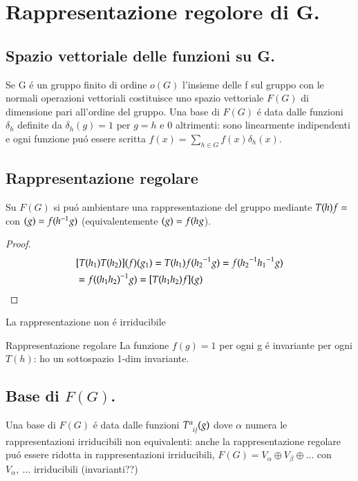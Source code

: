 \documentclass[oneside,12pt]{memoir}
\begin{document}
\section{Rappresentazione regolore di G.}

\subsection{Spazio vettoriale delle funzioni su G.}

Se G \'e un gruppo finito di ordine $o(G)$ l'insieme delle f sul gruppo con le normali operazioni vettoriali costituisce uno spazio vettoriale $F(G)$ di dimensione pari all'ordine del gruppo. Una base di $F(G)$ \'e data dalle funzioni $\delta_h$ definite da $\delta_h(g)=1$ per $g=h$ e $0$ altrimenti: sono linearmente indipendenti e ogni funzione pu\'o essere scritta $f(x)=\sum_{h\in G}f(x)\delta_h(x)$.

\subsection{Rappresentazione regolare}\label{ssec:regularr}

Su $F(G)$ si pu\'o ambientare una rappresentazione del gruppo mediante $T(h)f=\title{f}$ con $\title{f}(g)=f(\invers{h}g)$ (equivalentemente $\title{f}(g)=f(hg$).
\begin{proof}
\begin{align*}
&[T(h_1)T(h_2)](f)(g_1)=T(h_1)f({{h_2}^{-1}}g)=f({{h_2}^{-1}}{{h_1}^{-1}}g)\\
&=f({{(h_1h_2)}^{-1}}g)=[T(h_1h_2)f](g)
\end{align*}
\end{proof}

La rappresentazione non \'e irriducibile

\begin{definition}{Rappresentazione regolare}
La funzione $f(g)=1$ per ogni g \'e invariante per ogni $T(h)$: ho un sottospazio 1-dim invariante.

\end{definition}

\subsection{Base di $F(G)$.}

Una base di $F(G)$ \'e data dalle funzioni $T\indices{^\alpha_i_j}(g)$ dove $\alpha$ numera le rappresentazioni irriducibili non equivalenti: anche la rappresentazione regolare pu\'o essere ridotta in rappresentazioni irriducibili, $F(G)=V_{\alpha}\oplus V_{\beta}\oplus\ldots$ con $V_{\alpha},\ \ldots$ irriducibili (invarianti??)
\end{document}
